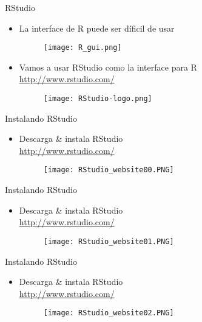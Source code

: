 \documentclass{beamer}
\begin{document}
\begin{frame}{RStudio}
\begin{itemize}
\item La interface de R puede ser díficil de usar
\begin{figure}[H]
\centering
\texttt{[image: R\_gui.png]}
\end{figure}
\item Vamos a usar RStudio como la interface para R\\
\url{http://www.rstudio.com/}
\begin{figure}[H]
\centering
\texttt{[image: RStudio-logo.png]}
\end{figure}
\end{itemize}
\end{frame}

\begin{frame}{Instalando RStudio}
\begin{itemize}
\item Descarga \& instala RStudio\\
\url{http://www.rstudio.com/}
\begin{figure}[H]
\centering
\texttt{[image: RStudio\_website00.PNG]}
\end{figure}
\end{itemize}
\end{frame}

\begin{frame}{Instalando RStudio}
\begin{itemize}
\item Descarga \& instala RStudio\\
\url{http://www.rstudio.com/}
\begin{figure}[H]
\centering
\texttt{[image: RStudio\_website01.PNG]}
\end{figure}
\end{itemize}
\end{frame}

\begin{frame}{Instalando RStudio}
\begin{itemize}
\item Descarga \& instala RStudio\\
\url{http://www.rstudio.com/}
\begin{figure}[H]
\centering
\texttt{[image: RStudio\_website02.PNG]}
\end{figure}
\end{itemize}
\end{frame}
\end{document}
